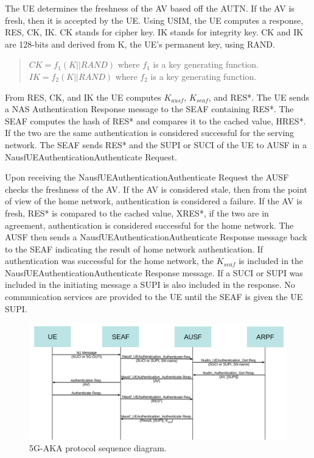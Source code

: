 \documentclass[11pt, pdftex]{article}
\begin{document}
The UE determines the freshness of the AV based off the AUTN.  If the AV is fresh, then it is accepted by the UE.  Using USIM, the UE computes a response, RES, CK, IK.  CK stands for cipher key.  IK stands for integrity key.  CK and IK are 128-bits and derived from K, the UE's permanent key, using RAND.  
\begin{quote}
	$CK = f_1(K||RAND) $ where $ f_1 $ is a key generating function.
	\newline
	$IK = f_2(K||RAND) $ where $ f_2 $ is a key generating function.
\end{quote} 
From RES, CK, and IK the UE computes $K_{ausf}$, $K_{seaf}$, and RES*.  The UE sends a NAS Authentication Response message to the SEAF containing RES*.  The SEAF computes the hash of RES* and compares it to the cached value, HRES*.  If the two are the same authentication is considered successful for the serving network.  The SEAF sends RES* and the SUPI or SUCI of the UE to AUSF in a Nausf\textunderscore UEAuthentication\textunderscore Authenticate Request.  

Upon receiving the Nausf\textunderscore UEAuthentication\textunderscore Authenticate Request the AUSF checks the freshness of the AV.  If the AV is considered stale, then from the point of view of the home network, authentication is considered a failure.  If the AV is fresh, RES* is compared to the cached value, XRES*, if the two are in agreement, authentication is considered successful for the home network.  The AUSF then sends a Nausf\textunderscore UEAuthentication\textunderscore Authenticate Response message back to the SEAF indicating the result of home network authentication.  If authentication was successful for the home network, the $K_{seaf}$ is included in the Nausf\textunderscore UEAuthentication\textunderscore Authenticate Response message.  If a SUCI or SUPI was included in the initiating message a SUPI is also included in the response.  No communication services are provided to the UE until the SEAF is given the UE SUPI.

\begin{figure}[h]
	\begin{center}
		\includegraphics[scale=0.21]{Figure2_2.png}
	\end{center}
	\caption{5G-AKA protocol sequence diagram.}
\end{figure}
\end{document}
